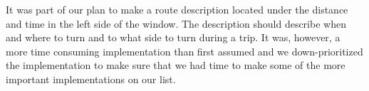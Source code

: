 It was part of our plan to make a route description located under the distance and time in the left side of the window. The description should describe when and where to turn and to what side to turn during a trip. It was, however, a more time consuming implementation than first assumed and we down-prioritized the implementation to make sure that we had time to make some of the more important implementations on our list. 

